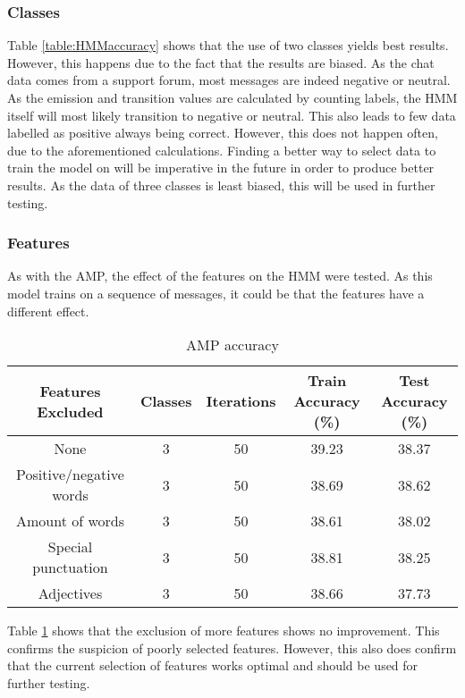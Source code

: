 \subsubsection*{Classes} 
Table \ref{table:HMMaccuracy} shows that the use of two classes yields best results. However, this happens due to the fact that the results are biased. As the chat data comes from a support forum, most messages are indeed negative or neutral. As the emission and transition values are calculated by counting labels, the HMM itself will most likely transition to negative or neutral. This also leads to few data labelled as positive always being correct. However, this does not happen often, due to the aforementioned calculations. Finding a better way to select data to train the model on will be imperative in the future in order to produce better results. As the data of three classes is least biased, this will be used in further testing.

\subsubsection*{Features}
As with the AMP, the effect of the features on the HMM were tested. As this model trains on a sequence of messages, it could be that the features have a different effect.

\begin{table}[h!]
\begin{center}
\begin{tabular}{| c | c | c | c | c |}
\hline
 {\textbf{Features Excluded}} 	 	& \textbf{Classes}	& {\textbf{Iterations}} 
 & {\textbf{Train Accuracy (\%)}} 					& {\textbf{Test Accuracy (\%)}} 
 \\
\hline
None						&	3	&	50	&	39.23	&	38.37	\\
Positive/negative words	&	3	&	50	&	38.69	&	38.62	\\
Amount of words			&	3	&	50	&	38.61	&	38.02	\\
Special punctuation		&	3	&	50	&	38.81	&	38.25	\\
Adjectives				&	3	&	50	&	38.66	&	37.73	\\
\hline
\end{tabular}
\caption{AMP accuracy}
\label{table:HMMfeatures}
\end{center}
\end{table}

Table \ref{table:HMMfeatures} shows that the exclusion of more features shows no improvement. This confirms the suspicion of poorly selected features. However, this also does confirm that the current selection of features works optimal and should be used for further testing.

